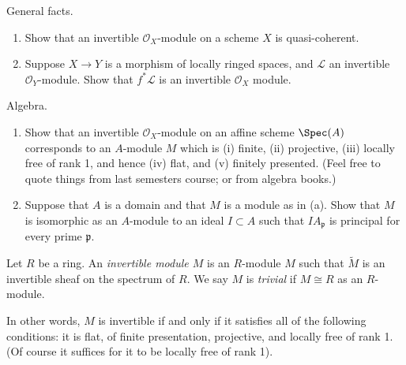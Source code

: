 \begin{exercise}
\label{exercise-general-facts-invertible}
General facts.
\begin{enumerate}
\item Show that an invertible ${\mathcal O}_X$-module on
a scheme $X$ is quasi-coherent.
\item Suppose $X\to Y$ is a morphism of locally ringed spaces,
and ${\mathcal L}$ an invertible ${\mathcal O}_Y$-module.
Show that $f^\ast {\mathcal L}$ is an invertible ${\mathcal O}_X$ module.
\end{enumerate}
\end{exercise}

\begin{exercise}
\label{exercise-invertible-algebra}
Algebra.
\begin{enumerate}
\item Show that an invertible ${\mathcal O}_X$-module on
an affine scheme $\Spec(A)$ corresponds to an $A$-module $M$ which is
(i) finite, (ii) projective, (iii) locally free of rank 1,
and hence (iv) flat, and (v) finitely presented. (Feel free to
quote things from last semesters course; or from algebra books.)
\item Suppose that $A$ is a domain and that $M$ is
a module as in (a). Show that $M$ is isomorphic as an $A$-module
to an ideal $I \subset A$ such that $IA_{\mathfrak p}$ is principal for
every prime ${\mathfrak p}$.
\end{enumerate}
\end{exercise}

\begin{definition}
\label{definition-invertible-module}
Let $R$ be a ring. An {\it invertible module $M$} is an $R$-module
$M$ such that $\widetilde M$ is an invertible sheaf on the
spectrum of $R$. We say $M$ is {\it trivial} if $M \cong R$ as
an $R$-module.
\end{definition}

\noindent
In other words, $M$ is invertible if and only if
it satisfies all of the following conditions:
it is flat, of finite presentation, projective, and
locally free of rank 1. (Of course it suffices for it
to be locally free of rank 1).


